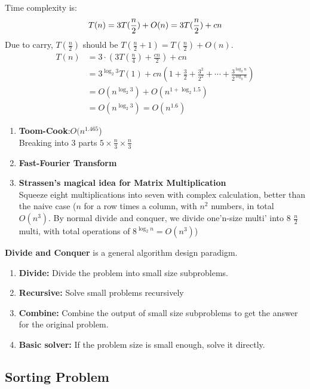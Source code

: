     Time complexity is:
    \[
        T(n)=3T(\frac{n}{2})+O(n)= 3T(\frac{n}{2})+cn\\
        \]
    Due to carry, $T(\frac{n}{2})$ should be $T(\frac{n}{2}+1)=T(\frac{n}{2})+O(n)$.
\[  \begin{aligned}
    T(n)&=3\cdot(3T(\frac{n}{4})+\frac{cn}{2})+cn \\
    &=3^{\log_2 3}T(1)+cn(1+\frac{3}{2}+\frac{3^2}{2^2}+\cdots+\frac{3^{\log_2n}}{2^{\log_2n}})\\
    &=O(n^{\log_2 3})+O(n^{1+\log_2 1.5})\\
    &=O(n^{\log_2 3})=O(n^{1.6}) 
    \end{aligned}
    \]

    \begin{enumerate}
        \item \textbf{Toom-Cook}:$O(n^{1.465}$)\\
        Breaking into 3 parts $5\times\frac{n}{3}\times\frac{n}{3}$
        \item \textbf{Fast-Fourier Transform} 
        \item \textbf{Strassen's magical idea for Matrix Multiplication} \\
        Squeeze eight multiplications into seven with complex calculation, better than the naive case ($n$ for a row times a column, with $n^2$ numbers, in total $O(n^3)$. By normal divide and conquer, we divide one'n-size multi' into 8 $\frac{n}{2}$ multi, with total operations of $8^{\log_2n}=O(n^3)$)
    \end{enumerate}
    


\begin{remark}
    \textbf{Divide and Conquer} is a general algorithm design paradigm.
\begin{enumerate}
    \item \textbf{Divide:} Divide the problem into small size subproblems.
    \item \textbf{Recursive:} Solve small problems recursively
    \item \textbf{Combine:}  Combine the output of small size subproblems to get the answer for the original problem.
    \item \textbf{Basic solver:} If the problem size is small enough, solve it directly.
\end{enumerate}
\end{remark}

\subsection{Sorting Problem}

